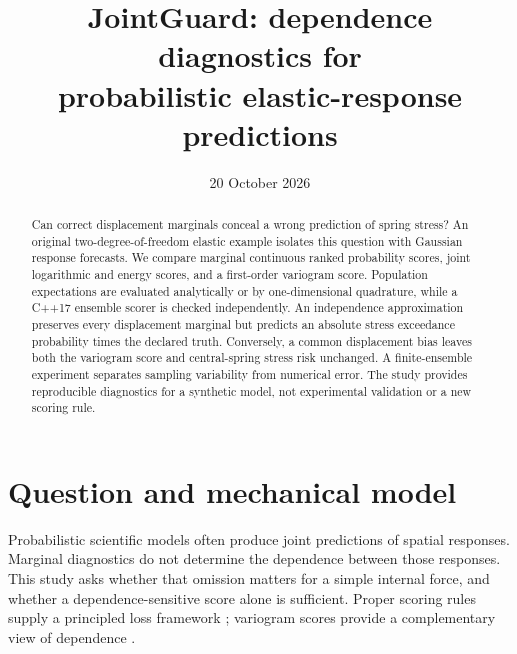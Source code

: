 \documentclass[10pt,a4paper]{article}
\title{JointGuard: dependence diagnostics for\protect\\ probabilistic elastic-response predictions}
\author{}
\date{20 October 2026}
\begin{document}
\maketitle
\vspace{-8mm}
\begin{abstract}
Can correct displacement marginals conceal a wrong prediction of spring stress?
An original two-degree-of-freedom elastic example isolates this question with
Gaussian response forecasts. We compare marginal continuous ranked probability
scores, joint logarithmic and energy scores, and a first-order variogram score.
Population expectations are evaluated analytically or by one-dimensional
quadrature, while a C++17 ensemble scorer is checked independently. An
independence approximation preserves every displacement marginal but predicts
an absolute stress exceedance probability \RiskRatio{} times the declared
truth. Conversely, a common displacement bias leaves both the variogram score
and central-spring stress risk unchanged. A finite-ensemble experiment separates
sampling variability from numerical error. The study provides reproducible
diagnostics for a synthetic model, not experimental validation or a new scoring rule.
\end{abstract}

\section{Question and mechanical model}
Probabilistic scientific models often produce joint predictions of spatial
responses. Marginal diagnostics do not determine the dependence between those
responses. This study asks whether that omission matters for a simple internal
force, and whether a dependence-sensitive score alone is sufficient. Proper
scoring rules supply a principled loss framework \cite{gneiting}; variogram
scores provide a complementary view of dependence \cite{scheuerer}.
\end{document}
